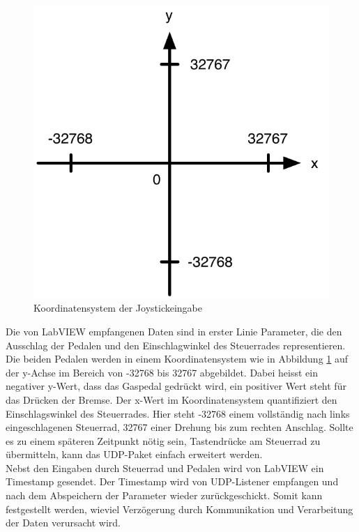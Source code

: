 \begin{figure}[H]
\centering 
\includegraphics[width=0.5\linewidth]{src/koordinatensystem.pdf}
\caption{Koordinatensystem der Joystickeingabe} %
\label{Koordinatensystem} %
\end{figure}

Die von LabVIEW empfangenen Daten sind in erster Linie Parameter, die den Ausschlag der Pedalen und den Einschlagwinkel des Steuerrades representieren. Die beiden Pedalen werden in einem Koordinatensystem wie in Abbildung \ref{Koordinatensystem} auf der y-Achse im Bereich von -32768 bis 32767 abgebildet. Dabei heisst ein negativer y-Wert, dass das Gaspedal gedrückt wird, ein positiver Wert steht für das Drücken der Bremse. Der x-Wert im Koordinatensystem quantifiziert den Einschlagswinkel des Steuerrades. Hier steht -32768 einem vollständig nach links eingeschlagenen Steuerrad, 32767 einer Drehung bis zum rechten Anschlag. Sollte es zu einem späteren Zeitpunkt nötig sein, Tastendrücke am Steuerrad zu übermitteln, kann das UDP-Paket einfach erweitert werden.\\
Nebst den Eingaben durch Steuerrad und Pedalen wird von LabVIEW ein Timestamp gesendet. Der Timestamp wird von UDP-Listener empfangen und nach dem Abspeichern der Parameter wieder zurückgeschickt. Somit kann festgestellt werden, wieviel Verzögerung durch Kommunikation und Verarbeitung der Daten verursacht wird.\\

